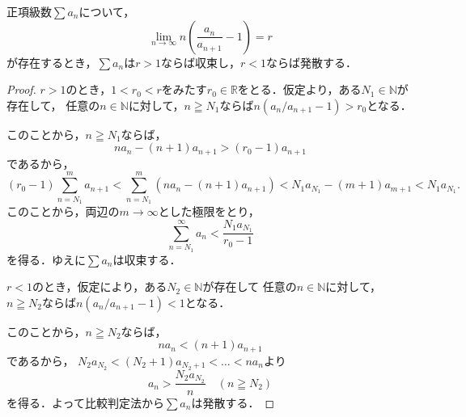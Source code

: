 
正項級数$\sum a_n$について，
\[
    \lim_{n\to\infty} n \left(\frac{a_n}{a_{n+1}}-1 \right) = r
\]
が存在するとき，$\sum a_n$は$r >1$ならば収束し，$r < 1$ならば発散する．

\begin{proof}
    $r>1$のとき，$ 1< r_0 < r$をみたす$r_0 \in \mathbb{R}$をとる．仮定より，ある$N_1 \in \mathbb{N}$が存在して，
    任意の$n \in \mathbb{N}$に対して，$n \geqq N_1$ならば$n (a_n/a_{n+1}-1) > r_0$となる．

    このことから，$ n \geqq N_1$ならば，
    \[
        n a_n -(n+1)a_{n+1} > (r_0-1) a_{n+1}
    \]
    であるから，
    \[
        (r_0-1) \sum_{n=N_1}^{m} a_{n+1}  < \sum_{n=N_1}^{m} (n a_n - (n+1) a_{n+1})
        <N_1 a_{N_1} - (m+1) a_{m+1}
        < N_1 a_{N_1}.
    \]
    このことから，両辺の$m \to \infty$とした極限をとり，
    \[
        \sum_{n=N_1}^{\infty} a_n <\frac{N_1 a_{N_1}}{r_0-1}
    \]
    を得る．ゆえに$\sum a_n$は収束する．

    $r < 1$のとき，仮定により，ある$N_2 \in \mathbb{N}$が存在して
    任意の$n \in \mathbb{N}$に対して，$n \geqq N_2$ならば$n(a_n/a_{n+1}-1) < 1$となる．

    このことから，$n \geqq N_2$ならば，
    \[
        n a_n < (n+1) a_{n+1}
    \]
    であるから， $N_2 a_{N_2} < (N_2 +1)a_{N_2+1} <  \dots< n a_n $より
    \[
        a_n > \frac{N_2 a_{N_2}}{n} \quad (n \geqq N_2)
    \]
    を得る．よって比較判定法から$\sum a_n$は発散する．
\end{proof}

